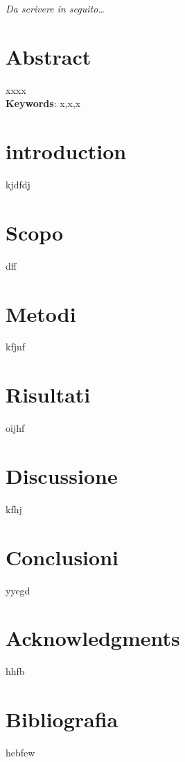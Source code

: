 \documentclass[12pt,a4paper]{article}
\begin{document}
\begin{titlepage}                      
%
\thispagestyle{empty}                   %
\topmargin=6.5cm                        %
\raggedleft                             %
\large                                  %
                                       
\em                                     %
Da scrivere in seguito\ldots                      %
\newpage                                
\clearpage{\pagestyle{empty}\cleardoublepage}%
\end{titlepage}

\newpage
\tableofcontents

\newpage
\section{Abstract}
 xxxx\\
 
 
\vspace{1cm}
\textbf{Keywords}: x,x,x

\newpage
\section{introduction}
kjdfdj

\newpage
\section{Scopo}
dff

\newpage
\section{Metodi}
kfjnf

\newpage
\section{Risultati}
oijhf

\newpage
\section{Discussione}
kfhj

\newpage
\section{Conclusioni}

yyegd

\newpage
\section{Acknowledgments}
hhfb




\newpage
\section{Bibliografia}
hebfew
\end{document}
